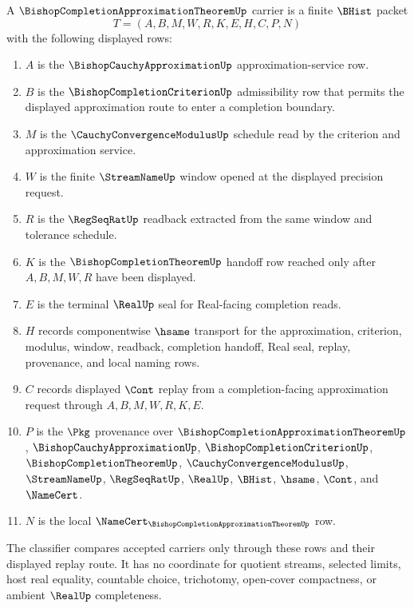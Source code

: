 \begin{definition}
\label{def:bishop-completion-approximation-theorem-carrier}
A $\BishopCompletionApproximationTheoremUp$ carrier is a finite $\BHist$ packet
$$
T=(A,B,M,W,R,K,E,H,C,P,N)
$$
with the following displayed rows:
\begin{enumerate}
\item $A$ is the $\BishopCauchyApproximationUp$ approximation-service row.
\item $B$ is the $\BishopCompletionCriterionUp$ admissibility row that permits the displayed approximation route to enter a completion boundary.
\item $M$ is the $\CauchyConvergenceModulusUp$ schedule read by the criterion and approximation service.
\item $W$ is the finite $\StreamNameUp$ window opened at the displayed precision request.
\item $R$ is the $\RegSeqRatUp$ readback extracted from the same window and tolerance schedule.
\item $K$ is the $\BishopCompletionTheoremUp$ handoff row reached only after $A,B,M,W,R$ have been displayed.
\item $E$ is the terminal $\RealUp$ seal for Real-facing completion reads.
\item $H$ records componentwise $\hsame$ transport for the approximation, criterion, modulus, window, readback, completion handoff, Real seal, replay, provenance, and local naming rows.
\item $C$ records displayed $\Cont$ replay from a completion-facing approximation request through $A,B,M,W,R,K,E$.
\item $P$ is the $\Pkg$ provenance over $\BishopCompletionApproximationTheoremUp$, $\BishopCauchyApproximationUp$, $\BishopCompletionCriterionUp$, $\BishopCompletionTheoremUp$, $\CauchyConvergenceModulusUp$, $\StreamNameUp$, $\RegSeqRatUp$, $\RealUp$, $\BHist$, $\hsame$, $\Cont$, and $\NameCert$.
\item $N$ is the local $\NameCert_{\BishopCompletionApproximationTheoremUp}$ row.
\end{enumerate}
The classifier compares accepted carriers only through these rows and their displayed replay route. It has no coordinate for quotient streams, selected limits, host real equality, countable choice, trichotomy, open-cover compactness, or ambient $\RealUp$ completeness.
\end{definition}

